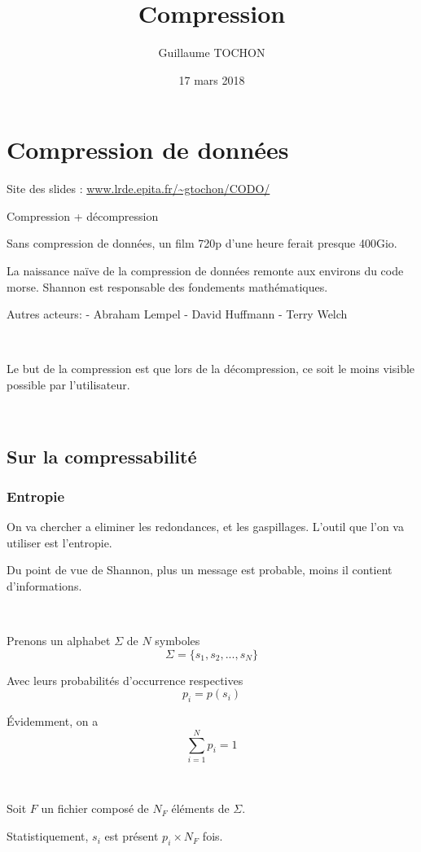 \documentclass[a4paper,11pt]{article}
\title{Compression}
\author{Guillaume TOCHON}
\date{17 mars 2018}
\begin{document}
\maketitle
\tableofcontents

\section{Compression de données}

Site des slides : \url{www.lrde.epita.fr/~gtochon/CODO/}

Compression + décompression

Sans compression de données, un film 720p d'une heure ferait presque 400Gio.

La naissance naïve de la compression de données remonte aux environs du code
morse.
Shannon est responsable des fondements mathématiques.

Autres acteurs:
  - Abraham Lempel
  - David Huffmann
  - Terry Welch

\

Le but de la compression est que lors de la décompression, ce soit le moins
visible possible par l'utilisateur.

\

\subsection{Sur la compressabilité}

\subsubsection{Entropie}

On va chercher a eliminer les redondances, et les gaspillages.
L'outil que l'on va utiliser est l'entropie.

Du point de vue de Shannon, plus un message est probable, moins il contient
d'informations.

\

Prenons un alphabet $\Sigma$ de $N$ symboles
$$ \Sigma = \{s_1,s_2, ..., s_N\} $$

Avec leurs probabilités d'occurrence respectives
$$ p_i = p(s_i) $$

Évidemment, on a
$$ \sum_{i = 1}^{N} p_i = 1$$

\

Soit $F$ un fichier composé de $N_F$ éléments de $ \Sigma $.

Statistiquement, $s_i$ est présent $p_i \times N_F$ fois.
\end{document}
